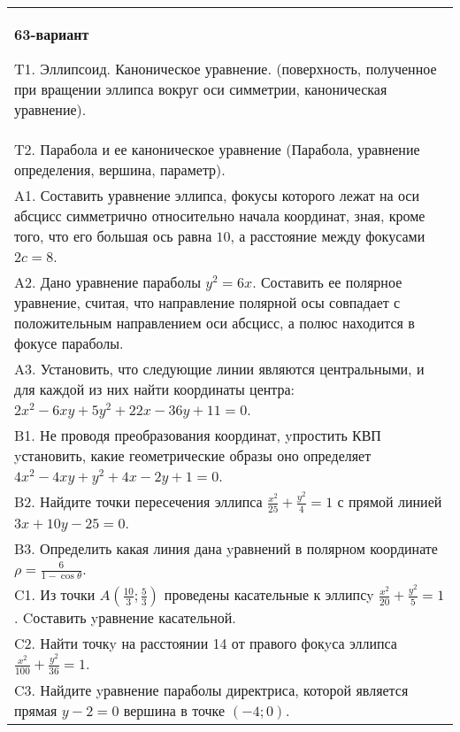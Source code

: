 \documentclass{article}
\begin{document}
\begin{tabular}{m{17cm}}
\textbf{63-вариант}
\newline

T1. Эллипсоид. Каноническое уравнение. (поверхность, полученное при вращении эллипса вокруг оси симметрии, каноническая уравнение).\\

T2. Парабола и ее каноническое уравнение (Парабола, уравнение определения, вершина, параметр).\\

A1. Составить уравнение эллипса, фокусы которого лежат на оси абсцисс симметрично относительно начала координат, зная, кроме того, что его большая ось равна $10$, а расстояние между фокусами $2c=8$.\\

A2. Дано уравнение параболы $y^2=6x$. Составить ее полярное уравнение, считая, что направление полярной осы совпадает с положительным направлением оси абсцисс, а полюс находится в фокусе параболы.\\

A3. Установить, что следующие линии являются центральными, и для каждой из них найти координаты центра: $2x^{2}-6xy+5y^{2}+22x-36y+11=0$.\\

B1. Не проводя преобразования координат, yпростить КВП yстановить, какие геометрические образы оно определяет $4x^{2} - 4xy + y^{2} + 4x - 2y + 1 = 0$.  \\

B2. Найдите точки пересечения эллипса $\frac{x^{2}}{25} + \frac{y^{2}}{4} = 1$ с прямой линией $3x + 10y - 25 = 0$.  \\

B3. Определить какая линия дана yравнений в полярном координате $\rho = \frac{6}{1 - \cos\theta}$.  \\

C1. Из точки $A(\frac{10}{3};\frac{5}{3})$ проведены касательные к эллипсy $\frac{x^{2}}{20}+\frac{y^{2}}{5}=1$ . Cоставить yравнение касательной.  \\

C2. Найти точкy на расстоянии 14 от правого фокyса эллипса $\frac{x^{2}}{100}+\frac{y^{2}}{36}=1$.\\

C3. Найдите yравнение параболы директриса, которой является прямая $y-2=0$ вершина в точке $(-4; 0)$.\\

\end{tabular}
\vspace{1cm}
\end{document}

